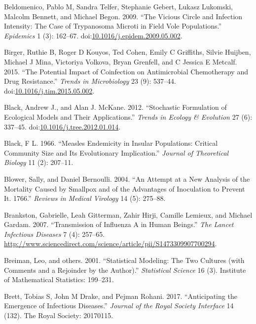 \documentclass[]{book}
\theoremstyle{definition}
\theoremstyle{definition}
\theoremstyle{definition}
\theoremstyle{remark}
\begin{document}
\hypertarget{ref-beldomenico09}{}
Beldomenico, Pablo M, Sandra Telfer, Stephanie Gebert, Lukasz Lukomski,
Malcolm Bennett, and Michael Begon. 2009. ``The Vicious Circle and
Infection Intensity: The Case of Trypanosoma Microti in Field Vole
Populations.'' \emph{Epidemics} 1 (3): 162--67.
doi:\href{https://doi.org/10.1016/j.epidem.2009.05.002}{10.1016/j.epidem.2009.05.002}.

\hypertarget{ref-birger15}{}
Birger, Ruthie B, Roger D Kouyos, Ted Cohen, Emily C Griffiths, Silvie
Huijben, Michael J Mina, Victoriya Volkova, Bryan Grenfell, and C
Jessica E Metcalf. 2015. ``The Potential Impact of Coinfection on
Antimicrobial Chemotherapy and Drug Resistance.'' \emph{Trends in
Microbiology} 23 (9): 537--44.
doi:\href{https://doi.org/10.1016/j.tim.2015.05.002}{10.1016/j.tim.2015.05.002}.

\hypertarget{ref-black12}{}
Black, Andrew J., and Alan J. McKane. 2012. ``Stochastic Formulation of
Ecological Models and Their Applications.'' \emph{Trends in Ecology \&
Evolution} 27 (6): 337--45.
doi:\href{https://doi.org/10.1016/j.tree.2012.01.014}{10.1016/j.tree.2012.01.014}.

\hypertarget{ref-black66}{}
Black, F L. 1966. ``Measles Endemicity in Insular Populations: Critical
Community Size and Its Evolutionary Implication.'' \emph{Journal of
Theoretical Biology} 11 (2): 207--11.

\hypertarget{ref-blower04}{}
Blower, Sally, and Daniel Bernoulli. 2004. ``An Attempt at a New
Analysis of the Mortality Caused by Smallpox and of the Advantages of
Inoculation to Prevent It. 1766.'' \emph{Reviews in Medical Virology} 14
(5): 275--88.

\hypertarget{ref-brankston07}{}
Brankston, Gabrielle, Leah Gitterman, Zahir Hirji, Camille Lemieux, and
Michael Gardam. 2007. ``Transmission of Influenza A in Human Beings.''
\emph{The Lancet Infectious Diseases} 7 (4): 257--65.
\url{http://www.sciencedirect.com/science/article/pii/S1473309907700294}.

\hypertarget{ref-breiman01}{}
Breiman, Leo, and others. 2001. ``Statistical Modeling: The Two Cultures
(with Comments and a Rejoinder by the Author).'' \emph{Statistical
Science} 16 (3). Institute of Mathematical Statistics: 199--231.

\hypertarget{ref-brett17}{}
Brett, Tobias S, John M Drake, and Pejman Rohani. 2017. ``Anticipating
the Emergence of Infectious Diseases.'' \emph{Journal of the Royal
Society Interface} 14 (132). The Royal Society: 20170115.
\end{document}
